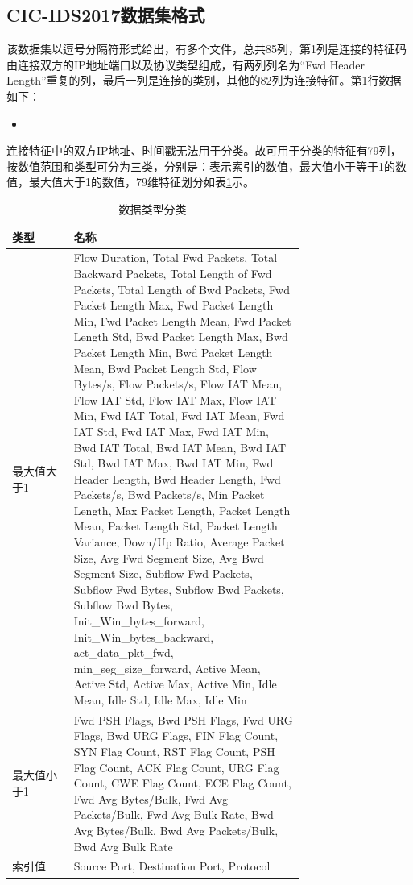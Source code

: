 \subsection{CIC-IDS2017数据集格式}

该数据集以逗号分隔符形式给出，有多个文件，总共85列，第1列是连接的特征码由连接双方的IP地址端口以及协议类型组成，有两列列名为“Fwd Header Length”重复的列，最后一列是连接的类别，其他的82列为连接特征。第1行数据如下：
\begin{itemize}
\item {}
\end{itemize}
连接特征中的双方IP地址、时间戳无法用于分类。故可用于分类的特征有79列，按数值范围和类型可分为三类，分别是：表示索引的数值，最大值小于等于1的数值，最大值大于1的数值，79维特征划分如表\ref{table:cic2017_feature_types}示。

\begin{table}[htb]
\centering
\caption{数据类型分类}
\begin{tabular}{p{0.15\linewidth}p{0.57\linewidth}}
\toprule
\textbf{类型} & \textbf{名称} \\
\midrule
最大值大于1 & Flow Duration, Total Fwd Packets, Total Backward Packets, Total Length of Fwd Packets, Total Length of Bwd Packets, Fwd Packet Length Max, Fwd Packet Length Min, Fwd Packet Length Mean, Fwd Packet Length Std, Bwd Packet Length Max, Bwd Packet Length Min, Bwd Packet Length Mean, Bwd Packet Length Std, Flow Bytes/s, Flow Packets/s, Flow IAT Mean, Flow IAT Std, Flow IAT Max, Flow IAT Min, Fwd IAT Total, Fwd IAT Mean, Fwd IAT Std, Fwd IAT Max, Fwd IAT Min, Bwd IAT Total, Bwd IAT Mean, Bwd IAT Std, Bwd IAT Max, Bwd IAT Min, Fwd Header Length, Bwd Header Length, Fwd Packets/s, Bwd Packets/s, Min Packet Length, Max Packet Length, Packet Length Mean, Packet Length Std, Packet Length Variance, Down/Up Ratio, Average Packet Size, Avg Fwd Segment Size, Avg Bwd Segment Size, Subflow Fwd Packets, Subflow Fwd Bytes, Subflow Bwd Packets, Subflow Bwd Bytes, Init\_Win\_bytes\_forward, Init\_Win\_bytes\_backward, act\_data\_pkt\_fwd, min\_seg\_size\_forward, Active Mean, Active Std, Active Max, Active Min, Idle Mean, Idle Std, Idle Max, Idle Min\\
\addlinespace
最大值小于1 & Fwd PSH Flags, Bwd PSH Flags, Fwd URG Flags, Bwd URG Flags, FIN Flag Count, SYN Flag Count, RST Flag Count, PSH Flag Count, ACK Flag Count, URG Flag Count, CWE Flag Count, ECE Flag Count, Fwd Avg Bytes/Bulk, Fwd Avg Packets/Bulk, Fwd Avg Bulk Rate, Bwd Avg Bytes/Bulk, Bwd Avg Packets/Bulk, Bwd Avg Bulk Rate \\
\addlinespace
索引值 & Source Port, Destination Port, Protocol \\
\bottomrule
\end{tabular}
\label{table:cic2017_feature_types}
\end{table}


